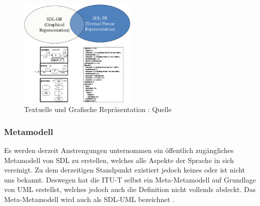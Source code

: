 \begin{figure}[h]
	\centering
	\includegraphics[width=0.5\textwidth]{Graphics/TextUndGrafik.png}
	\caption{Textuelle und Grafische Repräsentation : Quelle \cite{Reed_2000}}
	\label{fig:TextUndGrafik}
\end{figure}

\subsubsection{Metamodell}
\label{ssc:Metamodell}
Es werden derzeit Anstrengungen unternommen ein öffentlich zugängliches Metamodell von \ac{SDL} zu erstellen, welches alle Aspekte der Sprache in sich vereinigt. Zu dem derzeitigen Standpunkt existiert jedoch keines oder ist nicht uns bekannt. Deswegen hat die \ac{ITU-T} selbst ein Meta-Metamodell auf Grundlage von 
\ac{UML} erstellst, welches jedoch auch die Definition nicht vollends abdeckt. Das Meta-Metamodell wird auch als SDL-UML bezeichnet \cite[18]{ITUT109_2016}.
